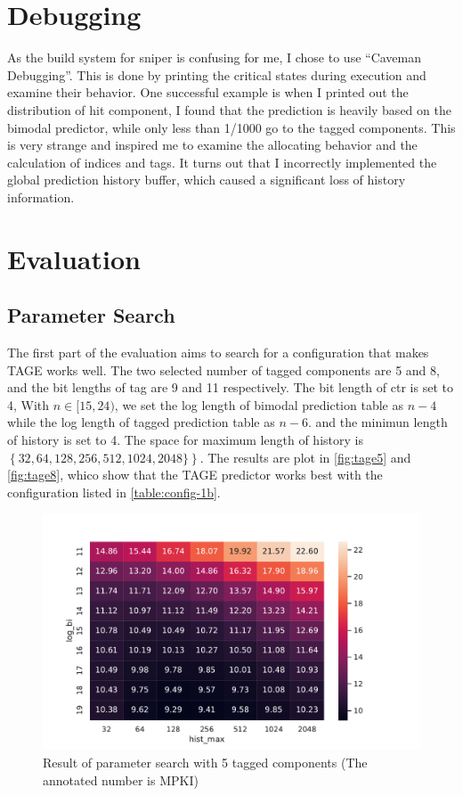 \documentclass[screen,nonacm]{acmart}
\begin{document}
\section{Debugging}

As the build system for sniper is confusing for me, I chose to use ``Caveman Debugging''.
This is done by printing the critical states during execution and examine their behavior.
One successful example is when I printed out the distribution of hit component,
I found that the prediction is heavily based on the bimodal predictor,
while only less than 1/1000 go to the tagged components.
This is very strange and inspired me to examine the allocating behavior and the calculation of indices and tags.
It turns out that I incorrectly implemented the global prediction history buffer,
which caused a significant loss of history information.

\section{Evaluation}

\subsection{Parameter Search}

The first part of the evaluation aims to search for a configuration that makes TAGE works well.
The two selected number of tagged components are 5 and 8, and the bit lengths of \textsf{tag} are 9 and 11 respectively.
The bit length of \textsf{ctr} is set to 4,
With \(n \in [15,24) \), we set the log length of bimodal prediction table as \( n-4 \) while
the log length of tagged prediction table as \(n-6\).
and the minimun length of history is set to 4.
The space for maximum length of history is \(
\left\{  32, 64, 128, 256, 512, 1024, 2048  \}\right\}
\).
The results are plot in \autoref{fig:tage5} and \autoref{fig:tage8},
whico show that the TAGE predictor works best with the configuration listed in \autoref{table:config-1b}.


\begin{figure}
  \centering
  \includegraphics[width=0.64\linewidth]{images/tage5.pdf}
  \caption{Result of parameter search with 5 tagged components (The annotated number is MPKI)}\label{fig:tage5}
\end{figure}
\end{document}
